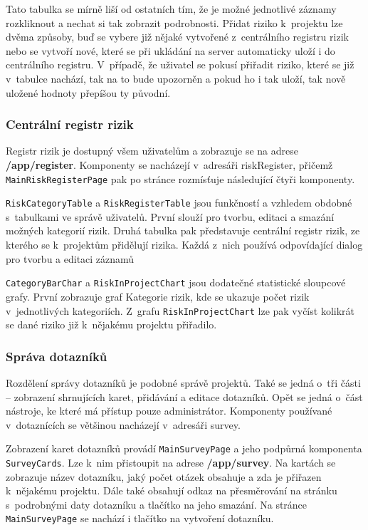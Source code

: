 Tato tabulka se mírně liší od ostatních tím, že je možné jednotlivé záznamy rozkliknout a nechat si tak zobrazit podrobnosti. Přidat riziko k~projektu lze dvěma způsoby, buď se vybere již nějaké vytvořené z~centrálního registru rizik nebo se vytvoří nové, které se při ukládání na server automaticky uloží i do centrálního registru. V~případě, že uživatel se pokusí přiřadit riziko, které se již v~tabulce nachází, tak na to bude upozorněn a pokud ho i tak uloží, tak nově uložené hodnoty přepíšou ty původní.


\subsubsection *{Centrální registr rizik}

Registr rizik je dostupný všem uživatelům a zobrazuje se na adrese \textbf{/app/register}. Komponenty se nacházejí v~adresáři riskRegister, přičemž \texttt{MainRiskRegisterPage} pak po stránce rozmísťuje následující čtyři komponenty. 

\texttt{RiskCategoryTable} a \texttt{RiskRegisterTable} jsou funkčností a vzhledem obdobné s~tabulkami ve správě uživatelů. První slouží pro tvorbu, editaci a smazání možných kategorií rizik. Druhá tabulka pak představuje centrální registr rizik, ze kterého se k~projektům přidělují rizika. Každá z~nich používá odpovídající dialog pro tvorbu a editaci záznamů

\texttt{CategoryBarChar} a \texttt{RiskInProjectChart} jsou dodatečné statistické sloupcové grafy. První zobrazuje graf Kategorie rizik, kde se ukazuje počet rizik v~jednotlivých kategoriích. Z~grafu \texttt{RiskInProjectChart} lze pak vyčíst kolikrát se dané riziko již k~nějakému projektu přiřadilo.



\subsubsection *{Správa dotazníků}

Rozdělení správy dotazníků je podobné správě projektů. Také se jedná o~tři části – zobrazení shrnujících karet, přidávání a editace dotazníků. Opět se jedná o~část nástroje, ke které má přístup pouze administrátor. Komponenty používané v~dotaznících se většinou nacházejí v~adresáři survey.

Zobrazení karet dotazníků provádí \texttt{MainSurveyPage} a jeho podpůrná komponenta \texttt{Sur\-veyCards}. Lze k~nim přistoupit na adrese \textbf{/app/survey}. Na kartách se zobrazuje název dotazníku, jaký počet otázek obsahuje a zda je přiřazen k~nějakému projektu. Dále také obsahují odkaz na přesměrování na stránku s~podrobnými daty dotazníku a tlačítko na jeho smazání. Na stránce \texttt{MainSurveyPage} se nachází i tlačítko na vytvoření dotazníku.

